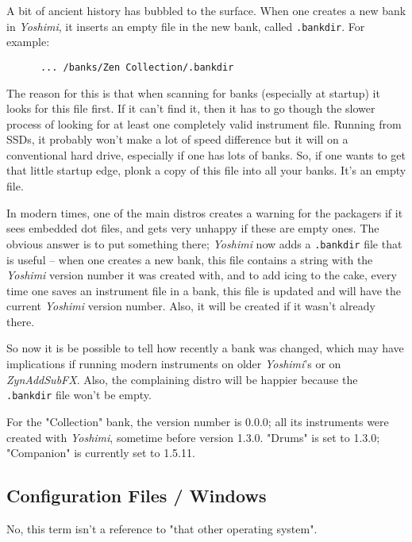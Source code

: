    A bit of ancient history has bubbled to the surface.
   When one creates a new bank in \textsl{Yoshimi}, it inserts an empty file in
   the new bank, called \texttt{.bankdir}.  For example:

   \begin{verbatim}
      ... /banks/Zen Collection/.bankdir
   \end{verbatim}

   The reason for this is that when scanning for banks (especially at startup) it
   looks for this file first. If it can't find it, then it has to go though the
   slower process of looking for at least one completely valid instrument file.
   Running from SSDs, it probably won't make a lot of speed difference but it
   will on a conventional hard drive, especially if one has lots of banks.  So,
   if one wants to get that little startup edge, plonk a copy of this file into
      all your banks.  It's an empty file.

   In modern times, one of the main distros creates a warning for the packagers
   if it sees embedded dot files, and gets very unhappy if these are empty ones.
   The obvious answer is to put something there; \textsl{Yoshimi} now adds a
   \texttt{.bankdir} file that is useful -- when one creates a new bank, this
   file contains a string with the \textsl{Yoshimi} version number it was
   created with, and to add icing to the cake, every time one saves an
   instrument file in a bank, this file is updated and will have the current
   \textsl{Yoshimi} version number. Also, it will be created if it wasn't
   already there.

   So now it is be possible to tell how recently a bank was changed, which may
   have implications if running modern instruments on older \textsl{Yoshimi}'s or
   on \textsl{ZynAddSubFX}. Also, the complaining distro will be happier because
   the \texttt{.bankdir} file won't be empty.

   For the "Collection" bank, the version number is 0.0.0; all its instruments
   were created with \textsl{Yoshimi}, sometime before version 1.3.0.  "Drums" is
   set to 1.3.0; "Companion" is currently set to 1.5.11.

\subsection{Configuration Files / Windows}
\label{subsec:configuration_windows}

   No, this term isn't a reference to "that other operating system".


